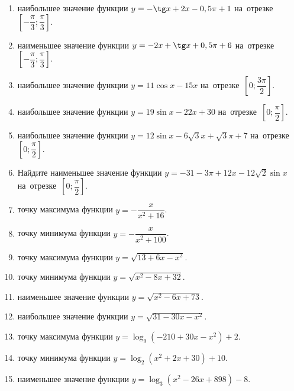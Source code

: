 \documentclass[a4paper,10pt]{article}
\begin{document}
\begin{enumerate}
\item {} наибольшее значение функции $y=-\tg x +2x-0,5\pi +1$ на~отрезке~$\left[-\dfrac{\pi}{3};\dfrac{\pi}{3}\right]$.

\item {} наименьшее значение функции $y=-2x +\tg x+0,5\pi+6$ на~отрезке~$\left[-\dfrac{\pi}{3};\dfrac{\pi}{3}\right]$.

\item {} наибольшее значение функции $y=11\cos x-15x$ на~отрезке~$\left[0;\dfrac{3\pi}{2}\right]$.

\item {} наибольшее значение функции $y=19\sin x-22x+30$ на~отрезке~$\left[0;\dfrac{\pi}{2}\right]$.

\item {} наибольшее значение функции $y=12\sin x-6\sqrt{3}x+\sqrt{3}\pi +7$ на~отрезке~$\left[0;\dfrac{\pi}{2}\right]$.

\item Найдите наименьшее значение функции $y=-31-3\pi+12x-12\sqrt{2}\sin x$ на~отрезке~$\left[0;\dfrac{\pi}{2}\right]$.

\item {} точку максимума функции $y=-\dfrac{x}{ x^2 +16}$.

\item {} точку минимума функции $y=-\dfrac{x}{ x^2 +100}$.

\item {} точку максимума функции $y=\sqrt{13+6x-x^2}$.

\item {} точку минимума функции $y=\sqrt{x^2-8x+32}$.

\item {} наименьшее значение функции $y=\sqrt{x^2-6x+73}$.

\item {} наибольшее значение функции $y=\sqrt{31-30x-x^2}$.

\item {} точку максимума функции $y=\log_9\left(-210+30x-x^2\right)+2$.

\item {} точку минимума функции $y=\log_2\left(x^2+2x+30\right)+10$.

\item {} наименьшее значение функции $y=\log_3\left(x^2-26x+898\right)-8$.


\end{enumerate}
\end{document}
